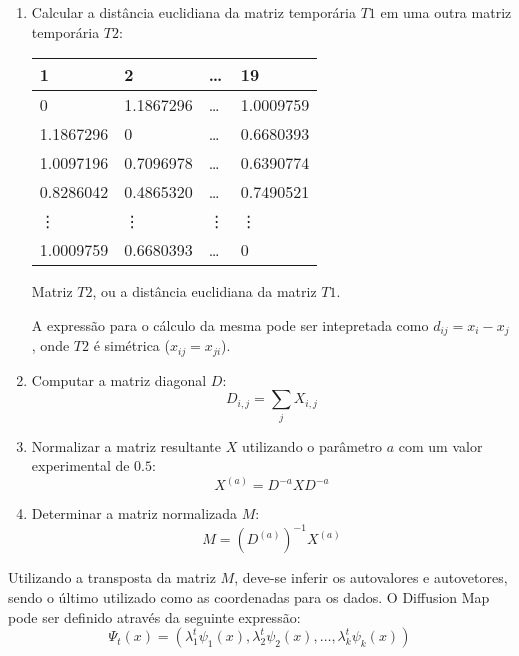 \documentclass{article}
\begin{document}
\begin{enumerate}
                \item Calcular a distância euclidiana da matriz temporária $T1$ em uma outra matriz temporária $T2$:

                    \begin{center}
                        \begin{tabular}{llll}
                            1         & 2          & \dots      & 19         \\
                            \hline
                            0         & 1.1867296  & \dots      & 1.0009759  \\
                            1.1867296 & 0          & \dots      & 0.6680393  \\
                            1.0097196 & 0.7096978  & \dots      & 0.6390774  \\
                            0.8286042 & 0.4865320  & \dots      & 0.7490521  \\
                            \vdots    & \vdots     & \vdots     & \vdots     \\
                            1.0009759 & 0.6680393  & \dots      & 0
                        \end{tabular}\par
                        Matriz $T2$, ou a distância euclidiana da matriz $T1$.
                    \end{center}

                    A expressão para o cálculo da mesma pode ser intepretada como $d_{ij}=x_{i}-x_{j}$, onde $T2$ é simétrica ($x_{ij}=x_{ji}$).

                \item Computar a matriz diagonal $D$:
                \[
                    D_{i,j}=\sum_{j}X_{i,j}
                \]

                \item Normalizar a matriz resultante $X$ utilizando o parâmetro $a$ com um valor experimental de $0.5$:
                \[
                    X^{(a)}=D^{-a}XD^{-a}
                \]

                \item Determinar a matriz normalizada $M$:
                \[
                    M=(D^{(a)})^{-1}X^{(a)}
                \]

            \end{enumerate}

            Utilizando a transposta da matriz $M$, deve-se inferir os autovalores e autovetores, sendo o último utilizado como as coordenadas para os dados.
            O Diffusion Map pode ser definido através da seguinte expressão:
            \[
                \Psi_{t}(x)=(\lambda_{1}^{t}\psi_{1}(x),\lambda_{2}^{t}\psi_{2}(x),\dots,\lambda_{k}^{t}\psi_{k}(x))
            \]
\end{document}
